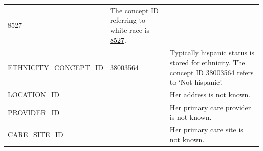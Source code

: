 \documentclass[11pt]{book}
\begin{document}
\begin{longtable}[]{@{}lll@{}}
\begin{minipage}[t]{0.16\columnwidth}
8527\strut
\end{minipage} & \begin{minipage}[t]{0.42\columnwidth}\raggedright\strut
The concept ID referring to white race is
\href{http://athena.ohdsi.org/search-terms/terms/8527}{8527}.\strut
\end{minipage}\tabularnewline
\begin{minipage}[t]{0.33\columnwidth}\raggedright\strut
ETHNICITY\_CONCEPT\_ID\strut
\end{minipage} & \begin{minipage}[t]{0.16\columnwidth}\raggedright\strut
38003564\strut
\end{minipage} & \begin{minipage}[t]{0.42\columnwidth}\raggedright\strut
Typically hispanic status is stored for ethnicity. The concept ID
\href{http://athena.ohdsi.org/search-terms/terms/38003564}{38003564}
refers to `Not hispanic'.\strut
\end{minipage}\tabularnewline
\begin{minipage}[t]{0.33\columnwidth}\raggedright\strut
LOCATION\_ID\strut
\end{minipage} & \begin{minipage}[t]{0.16\columnwidth}\raggedright\strut
\strut
\end{minipage} & \begin{minipage}[t]{0.42\columnwidth}\raggedright\strut
Her address is not known.\strut
\end{minipage}\tabularnewline
\begin{minipage}[t]{0.33\columnwidth}\raggedright\strut
PROVIDER\_ID\strut
\end{minipage} & \begin{minipage}[t]{0.16\columnwidth}\raggedright\strut
\strut
\end{minipage} & \begin{minipage}[t]{0.42\columnwidth}\raggedright\strut
Her primary care provider is not known.\strut
\end{minipage}\tabularnewline
\begin{minipage}[t]{0.33\columnwidth}\raggedright\strut
CARE\_SITE\_ID\strut
\end{minipage} & \begin{minipage}[t]{0.16\columnwidth}\raggedright\strut
\strut
\end{minipage} & \begin{minipage}[t]{0.42\columnwidth}\raggedright\strut
Her primary care site is not known.\strut
\end{minipage}\tabularnewline

\end{longtable}
\end{document}
